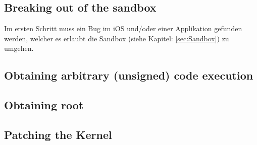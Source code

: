 \cite{TaiG[1]}
\cite{TaiG[2]}
\cite{TaiG[3]}

\subsection{Breaking out of the sandbox}
\label{sec:JBStep1}
Im ersten Schritt muss ein Bug im iOS und/oder einer Applikation gefunden werden, welcher es erlaubt \glqq die Sandbox\grqq{} (siehe Kapitel: \ref{sec:Sandbox}) zu umgehen. 

\subsection{Obtaining arbitrary (unsigned) code execution}
\label{sec:JBStep2}

\subsection{Obtaining root}
\label{sec:JBStep3}

\subsection{Patching the Kernel}
\label{sec:JBStep4}
